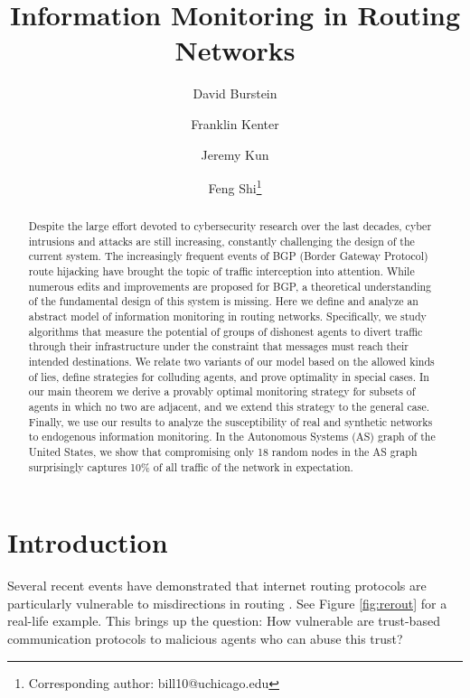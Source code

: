 \documentclass[reprint]{revtex4-1}
\begin{document}
\title{Information Monitoring in Routing Networks}

\author{David Burstein}
\author{Franklin Kenter}
\author{Jeremy Kun}
\author{Feng Shi\footnote{Corresponding author: bill10@uchicago.edu}}

\begin{abstract}
Despite the large effort devoted to cybersecurity research over the last decades, cyber intrusions and attacks are still increasing, constantly challenging the design of the current system. The increasingly frequent events of BGP (Border Gateway Protocol) route hijacking have brought the topic of traffic interception into attention. While numerous edits and improvements are proposed for BGP, a theoretical understanding of the fundamental design of this system is missing. Here we define and analyze an abstract model of information monitoring in routing networks. Specifically, we study algorithms that measure the potential of groups of
dishonest agents to divert traffic through their infrastructure under the constraint that messages must reach their intended destinations. We relate two variants of our model based on the allowed kinds of lies, define strategies for colluding agents, and prove optimality in special cases. In our main theorem we derive a provably optimal monitoring strategy for subsets of agents in which no two are adjacent, and we extend this strategy to the general case. Finally, we use our results to analyze the susceptibility of real and synthetic networks to endogenous information monitoring. In the Autonomous Systems (AS) graph of the United
States, we show that compromising only 18 random nodes in the AS graph surprisingly captures
10\% of all traffic of the network in expectation.
\end{abstract}


\maketitle

\section{Introduction}
Several recent events have demonstrated that internet routing protocols are particularly vulnerable to misdirections in routing \cite{GormanV13, JimCowie, Madory, Goodin}.  See Figure \ref{fig:rerout} for a real-life example. This brings up the question: How vulnerable are trust-based communication protocols to malicious agents who can abuse this trust?
\end{document}
